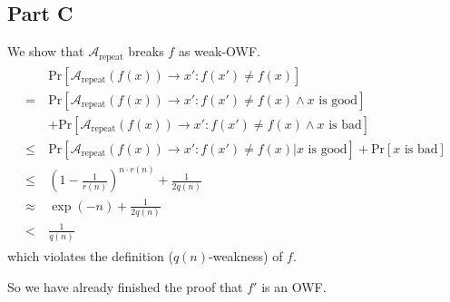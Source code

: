 \documentclass[8pt]{article}
\theoremstyle{compact}
\def\le{\leqslant}
\begin{document}
\subsection*{Part C}
\def\AREP{\mathcal{A}_{\text{repeat}}}
We show that $\AREP$ breaks $f$ as weak-OWF.
\begin{align*}
	\begin{split}
		&\text{Pr}[\AREP(f(x)) \to x': f(x') \neq f(x)] \\
		= \ & \text{Pr}[\AREP(f(x)) \to x': f(x') \neq f(x) \wedge x \text{ is good}] \\ &+ \text{Pr}[\AREP(f(x)) \to x': f(x') \neq f(x) \wedge x \text{ is bad}] \\
		\le \ & \text{Pr}[\AREP(f(x)) \to x': f(x') \neq f(x) | x \text{ is good}] + \text{Pr}[x \text{ is bad}] \\
		\le \ & \left(1 - \frac{1}{r(n)}\right)^{n \cdot r(n)} + \frac{1}{2q(n)} \\
		\approx\ & \exp(-n) + \frac{1}{2q(n)} \\
		< \ & \frac{1}{q(n)}
	\end{split}
\end{align*}
which violates the definition ($q(n)$-weakness) of $f$.

So we have already finished the proof that $f'$ is an OWF.
\end{document}
